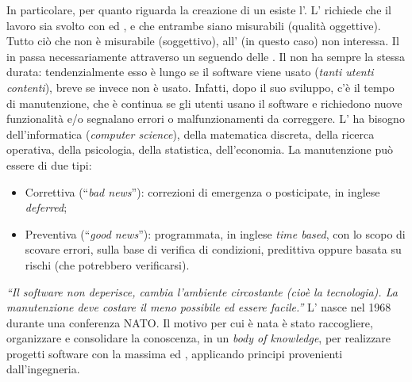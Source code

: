 \documentclass[../main]{subfiles}
\begin{document}
In particolare, per quanto riguarda la creazione di un  esiste l’. L’ richiede che il lavoro sia svolto con  ed , e che entrambe siano misurabili (qualità oggettive). Tutto ciò che non è misurabile (soggettivo), all’ (in questo caso) non interessa.\newline\newline
Il  in  passa necessariamente attraverso un  seguendo delle . Il  non ha sempre la stessa durata: tendenzialmente esso è lungo se il software viene usato (\textit{tanti utenti contenti}), breve se invece non è usato. Infatti, dopo il suo sviluppo, c’è il tempo di manutenzione, che è continua se gli utenti usano il software e richiedono nuove funzionalità e/o segnalano errori o malfunzionamenti da correggere.\newline\newline
L’ ha bisogno dell’informatica (\textit{computer science}), della matematica discreta, della ricerca operativa, della psicologia, della statistica, dell’economia.\newline\newline
La manutenzione può essere di due tipi:
\begin{itemize}
    \item Correttiva (“\textit{bad news}”): correzioni di emergenza o posticipate, in inglese \textit{deferred};
    \item Preventiva (“\textit{good news}”): programmata, in inglese \textit{time based}, con lo scopo di scovare errori, sulla base di verifica di condizioni, predittiva oppure basata su rischi (che potrebbero verificarsi).
\end{itemize}
\textit{“Il software non deperisce, cambia l’ambiente circostante (cioè la tecnologia). La manutenzione deve costare il meno possibile ed essere facile.”}\newline\newline
L’ nasce nel 1968 durante una conferenza NATO. Il motivo per cui è nata è stato raccogliere, organizzare e consolidare la conoscenza, in un \textit{body of knowledge}, per realizzare progetti software con la massima  ed , applicando principi provenienti dall’ingegneria.\newline\newline
\end{document}
